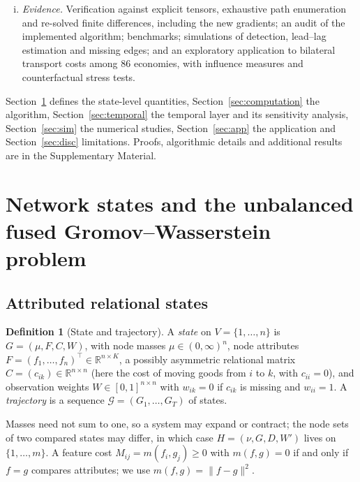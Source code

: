 \documentclass[12pt]{article}
\theoremstyle{definition}
\newtheorem{definition}{Definition}
\newcommand{\R}{\mathbb{R}}
\begin{document}
\begin{enumerate}[(i)]
\item \emph{Evidence.} Verification against explicit tensors, exhaustive path enumeration and re-solved finite differences, including the new gradients; an audit of the implemented algorithm; benchmarks; simulations of detection, lead--lag estimation and missing edges; and an exploratory application to bilateral transport costs among 86 economies, with influence measures and counterfactual stress tests.
\end{enumerate}

Section~\ref{sec:framework} defines the state-level quantities, Section~\ref{sec:computation} the algorithm, Section~\ref{sec:temporal} the temporal layer and its sensitivity analysis, Section~\ref{sec:sim} the numerical studies, Section~\ref{sec:app} the application and Section~\ref{sec:disc} limitations. Proofs, algorithmic details and additional results are in the Supplementary Material.

\section{Network states and the unbalanced fused Gromov--Wasserstein problem}
\label{sec:framework}

\subsection{Attributed relational states}

\begin{definition}[State and trajectory]\label{def:state}
A \emph{state} on $V=\{1,\dots,n\}$ is $G=(\mu,F,C,W)$, with node masses $\mu\in(0,\infty)^n$, node attributes $F=(f_1,\dots,f_n)^\top\in\R^{n\times K}$, a possibly asymmetric relational matrix $C=(c_{ik})\in\R^{n\times n}$ (here the cost of moving goods from $i$ to $k$, with $c_{ii}=0$), and observation weights $W\in[0,1]^{n\times n}$ with $w_{ik}=0$ if $c_{ik}$ is missing and $w_{ii}=1$. A \emph{trajectory} is a sequence $\mathcal G=(G_1,\dots,G_T)$ of states.
\end{definition}

Masses need not sum to one, so a system may expand or contract; the node sets of two compared states may differ, in which case $H=(\nu,G,D,W')$ lives on $\{1,\dots,m\}$. A feature cost $M_{ij}=m(f_i,g_j)\ge0$ with $m(f,g)=0$ if and only if $f=g$ compares attributes; we use $m(f,g)=\|f-g\|^2$.
\end{document}
